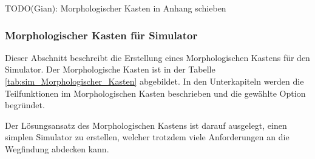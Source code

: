 \documentclass[../main.tex]{subfiles}
\begin{document}
\newpage
{\color{red} TODO(Gian): Morphologischer Kasten in Anhang schieben}
\subsubsection{Morphologischer Kasten für Simulator} \label{sec:sim_Morphologischer_Kasten}

Dieser Abschnitt beschreibt die Erstellung eines Morphologischen Kastens für den Simulator. Der Morphologische Kasten ist in der Tabelle \ref{tab:sim_Morphologischer_Kasten} abgebildet. In den Unterkapiteln werden die Teilfunktionen im Morphologischen Kasten beschrieben und die gewählte Option begründet.  

Der Lösungsansatz des Morphologischen Kastens ist darauf ausgelegt, einen simplen Simulator zu erstellen, welcher trotzdem viele Anforderungen an die Wegfindung abdecken kann.

\end{document}
